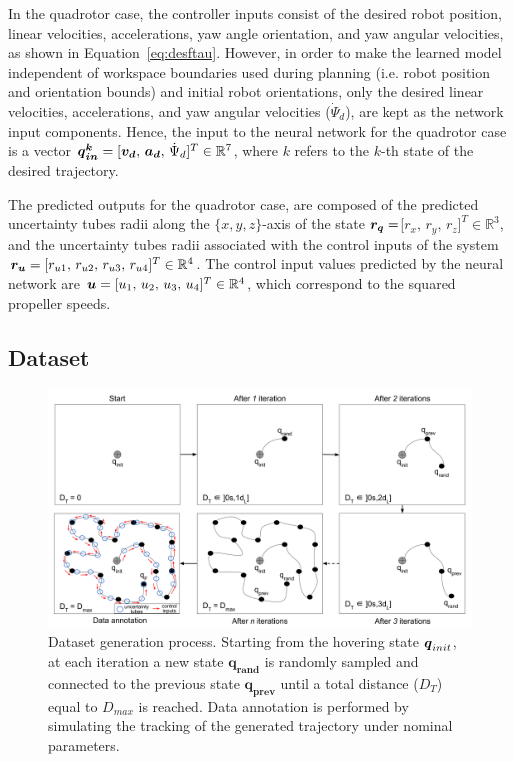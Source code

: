 In the quadrotor case, the controller inputs consist of the desired robot position, linear velocities, accelerations, yaw angle orientation, and yaw angular velocities, as shown in Equation~\ref{eq:desftau}. 
However, in order to make the learned model independent of workspace boundaries used during planning (i.e. robot position and orientation bounds) and initial robot orientations, only the desired linear velocities, accelerations, and yaw angular velocities ($\Dot{\Psi}_d$), are kept as the network input components.
Hence, the input to the neural network for the quadrotor case is a vector $\boldsymbol{\boldsymbol{q}_{in}^k} = [\boldsymbol{v_d} ,\, \boldsymbol{a_d} ,\, \Dot{\Psi}_d]^T \in \mathbb{R}^7$, where $k$ refers to the $k$-th state of the desired trajectory.

The predicted outputs for the quadrotor case, are composed of the predicted uncertainty tubes radii along the $\{x,y,z\}$-axis of the state $\boldsymbol{r_q}=$[$r_{x},\,r_{y},\,r_{z}]^T \in \mathbb{R}^3$, and the uncertainty tubes radii associated with the control inputs of the system $\boldsymbol{r_u} = [r_{u1},\,r_{u2},\,r_{u3},\,r_{u4}]^T \in \mathbb{R}^4$.
The control input values predicted by the neural network are $\boldsymbol{u} = [u_1 ,\, u_2 ,\, u_3 ,\, u_4]^T \in \mathbb{R}^4$, which correspond to the squared propeller speeds.

\subsection{Dataset}\label{sec:dataset_general}

\begin{figure} [t]
    \centering
    \includegraphics[width=0.9\linewidth]{figures/learning_quadrotor/dataset_generation.png}%
    \caption{Dataset generation process. 
    Starting from the hovering state $\boldsymbol{q}_{init}$, at each iteration a new state $\boldsymbol{q_{rand}}$ is randomly sampled and connected to the previous state $\boldsymbol{q_{prev}}$ until a total distance ($D_T$) equal to $D_{max}$ is reached.
    Data annotation is performed by simulating the tracking of the generated trajectory under nominal parameters.
    }%
    \label{fig: data_generation}%
\end{figure}

